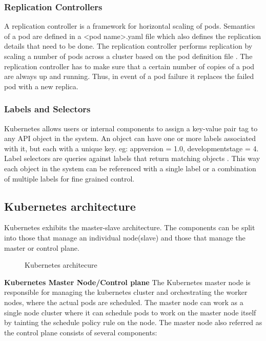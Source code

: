 \documentclass[9pt,twocolumn,twoside]{../../styles/osajnl}
\begin{document}
\subsubsection{Replication Controllers}
A replication controller is a framework for horizontal scaling of
pods. Semantics of a pod are defined in a <pod\textunderscore
name>.yaml file which also defines the replication details that need
to be done. The replication controller performs replication by scaling
a number of pods across a cluster based on the pod definition file
\cite{www-wiki-kubernetes}. The replication controller has to make
sure that a certain number of copies of a pod are always up and
running. Thus, in event of a pod failure it replaces the failed pod
with a new replica.

\subsubsection{Labels and Selectors}
Kubernetes allows users or internal components to assign a key-value
pair tag to any API object in the system. An object can have one or
more labels associated with it, but each with a unique key. eg:
appversion = 1.0, development\textunderscore stage = 4.  Label
selectors are queries against labels that return matching objects
\cite{www-kubernetes-digitalocean}. This way each object in the system
can be referenced with a single label or a combination of multiple
labels for fine grained control.

\subsection{Kubernetes architecture}
Kubernetes exhibits the master-slave architecture. The components can
be split into those that manage an individual node(slave) and those
that manage the master or control plane.

\begin{figure}[htbp]
\centering
{}
\caption{Kubernetes architecure \cite{www-kubernetes-architecture}}
\label{fig:Kubernetes Minimum Architecture}
\end{figure}


\textbf{Kubernetes Master Node/Control plane}
\newline
The Kubernetes master node is responsible for managing the kubernetes
cluster and orchestrating the worker nodes, where the actual pods are
scheduled. The master node can work as a single node cluster where it
can schedule pods to work on the master node itself by tainting the
schedule policy rule on the node. The master node also referred as
the control plane consists of several components:
\end{document}
